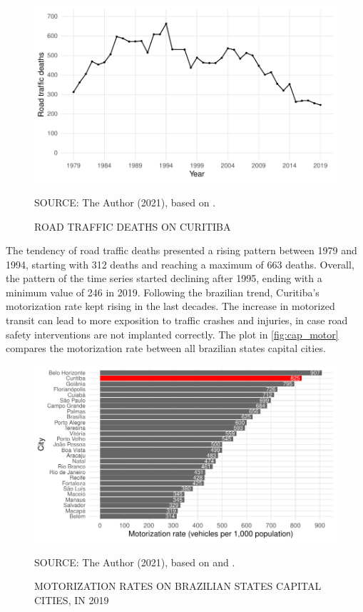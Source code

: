 

\begin{figure}[!htbp]
    \centering\footnotesize
    \captionsetup{font=footnotesize}
    \caption{ROAD TRAFFIC DEATHS ON CURITIBA}
    \includegraphics{fig/cwb_abs.pdf}
    \label{fig:cwb_abs}
    \par SOURCE: The Author (2021), based on \textcite{MinistryofHealth2020}.
\end{figure}  

The tendency of road traffic deaths presented a rising pattern between 1979 and 1994, starting with 312 deaths and reaching a maximum of 663 deaths. Overall, the pattern of the time series started declining after 1995, ending with a minimum value of 246 in 2019. Following the brazilian trend, Curitiba's motorization rate kept rising in the last decades. The increase in motorized transit can lead to more exposition to traffic crashes and injuries, in case road safety interventions are not implanted correctly. The plot in \autoref{fig:cap_motor} compares the motorization rate between all brazilian states capital cities.    

\begin{figure}[!htbp]
    \centering\footnotesize
    \captionsetup{font=footnotesize}
    \caption{MOTORIZATION RATES ON BRAZILIAN STATES CAPITAL CITIES, IN 2019}
    \includegraphics{fig/cap_motor.pdf}
    \label{fig:cap_motor}
    \par SOURCE: The Author (2021), based on \textcite{MinistryofHealth2021} and \textcite{DENATRAN2020}.
\end{figure}   

